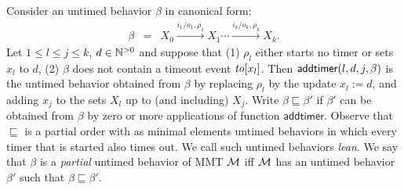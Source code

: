 Consider an untimed behavior $\beta$ in canonical form:
\begin{eqnarray*}
\beta & = & X_0 \xrightarrow{i_1/o_1, \rho_1} X_1  \cdots \xrightarrow{i_k/o_k, \rho_k} X_{k}.
\end{eqnarray*}
Let $1 \leq l \leq j \leq k$, $d \in {\mathbb N}^{>0}$ and suppose that 
(1) $\rho_l$ either starts no timer or sets $x_l$ to $d$,
(2) $\beta$ does not contain a timeout event $\mathit{to}[x_l]$.
Then $\mathsf{addtimer}({l,d,j,\beta})$ is the untimed behavior obtained from $\beta$ by
replacing $\rho_l$ by the update $x_l := d$, and adding $x_j$ to the sets $X_l$ up to (and including) $X_j$.
Write $\beta \sqsubseteq \beta'$ if $\beta'$ can be obtained from $\beta$ by zero or more applications of function $\mathsf{addtimer}$.
Observe that $\sqsubseteq$ is a partial order with as minimal elements untimed behaviors in which every timer that is started also times out.
We call such untimed behaviors \emph{lean}.
We say that $\beta$ is a \emph{partial} untimed behavior of MMT ${\mathcal M}$ iff ${\mathcal M}$ has an untimed behavior $\beta'$ such that $\beta \sqsubseteq \beta'$.

